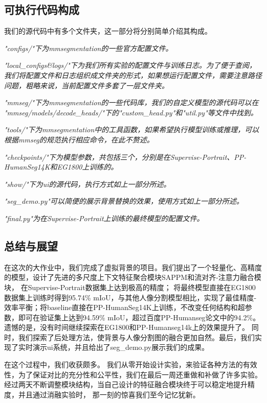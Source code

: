 \documentclass[11pt]{article}
\begin{document}
\subsection{可执行代码构成}
我们的源代码中有多个文件夹，这一部分将分别简单介绍其构成。

\textit{"configs/"下为mmsegmentation的一些官方配置文件。}

\textit{"local_configs\&logs/"下为我们所有实验的配置文件与训练日志。为了便于查阅，我们将配置文件和日志组织成文件夹的形式，如果想运行配置文件，需要注意路径问题，粗略来说，当前配置文件多套了一层文件夹。}

\textit{"mmseg/"下为mmsegmentation的一些代码库，我们的自定义模型的源代码可以在
"mmseg/models/decode_heads/"下的"custom_head.py"和"util.py"等文件中找到。}

\textit{"tools/"下为mmsegmentation中的工具函数，如果希望执行模型训练或推理，可以根据mmseg的规范执行相应命令，在此不赘述。}

\textit{"checkpoints/"下为模型参数，共包括三个，分别是在Supervise-Portrait、PP-HumanSeg14K和EG1800上训练的。}

\textit{"show/"下为ui的源代码，执行方式如上一部分所述。}

\textit{"seg_demo.py"可以简便的展示背景替换的效果，使用方式如上一部分所述。}

\textit{"final.py"为在Supervise-Portrait上训练的最终模型的配置文件。}

\subsection{总结与展望}

在这次的大作业中，我们完成了虚拟背景的项目。我们提出了一个轻量化、高精度的模型，设计了先进的多尺度上下文特征聚合模块SAPPM和流对齐-注意力融合模块，
在Supervise-Portrait数据集上达到极高的精度；
将最终模型直接在EG1800数据集上训练时得到95.74\% mIoU，与其他人像分割模型相比，实现了最佳精度-效率平衡；将baseline直接在PP-HumanSeg14K上训练，不改变任何结构和超参数，即可在验证集上达到94.59\% mIoU，超过百度PP-Humanseg论文中的94.2\%。遗憾的是，没有时间继续探索在EG1800和PP-Humanseg14k上的效果提升了。
同时，我们探索了后处理方法，使背景与人像分割图的融合更加自然。最后，我们实现了实时演示ui系统，并且给出了seg_demo.py展示我们的成果。

在这个过程中，我们收获颇多。
我们从零开始设计实验，来验证各种方法的有效性，为了保证对比的充分性和公平性，我们在最后一周还重做和补做了许多实验。
经过两天不断调整模块结构，当自己设计的特征融合模块终于可以稳定地提升精度，并且通过消融实验时，
那一刻的惊喜我们至今记忆犹新。
\end{document}
